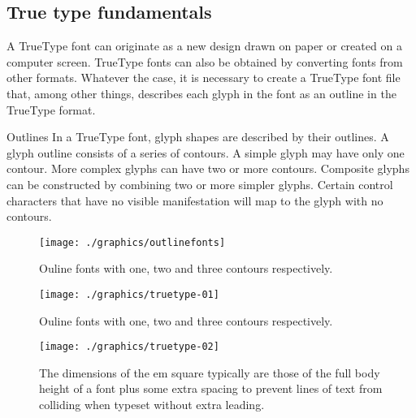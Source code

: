 \begin{multicols}{2}
\section*{True type fundamentals}

A TrueType font can originate as a new design drawn on paper or created on a computer screen. TrueType fonts can also be obtained by converting fonts from other formats. Whatever the case, it is necessary to create a TrueType font file that, among other things, describes each glyph in the font as an outline in the TrueType format. 

Outlines
In a TrueType font, glyph shapes are described by their outlines. A glyph outline consists of a series of contours. A simple glyph may have only one contour. More complex glyphs can have two or more contours. Composite glyphs can be constructed by combining two or more simpler glyphs. Certain control characters that have no visible manifestation will map to the glyph with no contours.
\end{multicols}


\begin{figure}[htp]%
  \texttt{[image: ./graphics/outlinefonts]}
  \caption{Ouline fonts with one, two and three contours respectively.}
  \label{fig:outline}
\end{figure}

\begin{figure}[htp]%
  \texttt{[image: ./graphics/truetype-01]}
  \caption{Ouline fonts with one, two and three contours respectively.}
  \label{fig:truetype01}
\end{figure}
\begin{figure}[htbp]%
  \centering
  \texttt{[image: ./graphics/truetype-02]}
  \caption{The dimensions of the em square typically are those of the full body height of a font plus some extra spacing to prevent lines of text from colliding when typeset without extra leading.}
  \label{fig:truetype02}
\end{figure}

